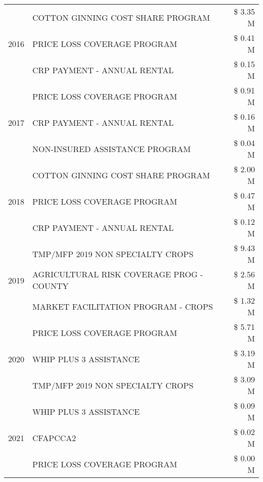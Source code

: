 \begin{tabular}{llr}
\cline{1-3}
\multirow[t]{3}{*}{2016} & COTTON GINNING COST SHARE PROGRAM & \$ 3.35 M \\
 & PRICE LOSS COVERAGE PROGRAM & \$ 0.41 M \\
 & CRP PAYMENT - ANNUAL RENTAL & \$ 0.15 M \\
\cline{1-3}
\multirow[t]{3}{*}{2017} & PRICE LOSS COVERAGE PROGRAM & \$ 0.91 M \\
 & CRP PAYMENT - ANNUAL RENTAL & \$ 0.16 M \\
 & NON-INSURED ASSISTANCE PROGRAM & \$ 0.04 M \\
\cline{1-3}
\multirow[t]{3}{*}{2018} & COTTON GINNING COST SHARE PROGRAM & \$ 2.00 M \\
 & PRICE LOSS COVERAGE PROGRAM & \$ 0.47 M \\
 & CRP PAYMENT - ANNUAL RENTAL & \$ 0.12 M \\
\cline{1-3}
\multirow[t]{3}{*}{2019} & TMP/MFP 2019 NON SPECIALTY CROPS & \$ 9.43 M \\
 & AGRICULTURAL RISK COVERAGE PROG - COUNTY & \$ 2.56 M \\
 & MARKET FACILITATION PROGRAM - CROPS & \$ 1.32 M \\
\cline{1-3}
\multirow[t]{3}{*}{2020} & PRICE LOSS COVERAGE PROGRAM & \$ 5.71 M \\
 & WHIP PLUS 3 ASSISTANCE & \$ 3.19 M \\
 & TMP/MFP 2019 NON SPECIALTY CROPS & \$ 3.09 M \\
\cline{1-3}
\multirow[t]{3}{*}{2021} & WHIP PLUS 3 ASSISTANCE & \$ 0.09 M \\
 & CFAPCCA2 & \$ 0.02 M \\
 & PRICE LOSS COVERAGE PROGRAM & \$ 0.00 M \\
\cline{1-3}
\bottomrule
\end{tabular}
